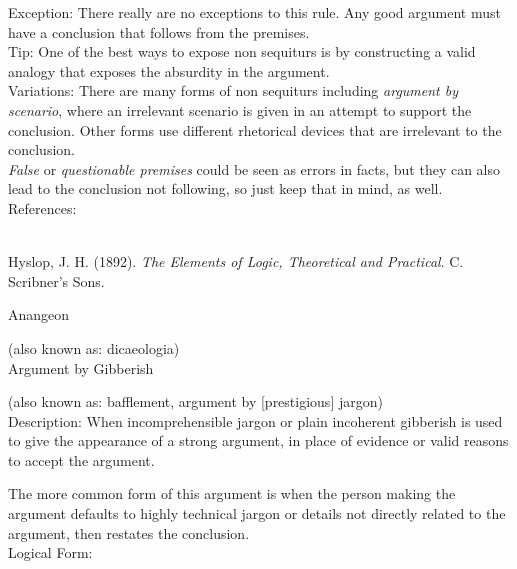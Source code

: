 \documentclass[a4paper,12pt,single,pdftex]{scrartcl}
\begin{document}
{    
      Exception: There really are no exceptions to this rule. Any good argument must have a conclusion that follows from the premises.
    \\

    
      Tip: One of the best ways to expose non sequiturs is by constructing a valid analogy that exposes the absurdity in the argument.
    \\

    
      Variations: There are many forms of non sequiturs including {\it argument by scenario}, where an irrelevant scenario is given in an attempt to support the conclusion.  Other forms use different rhetorical devices that are irrelevant to the conclusion.
    \\

    
      {\it False} or {\it questionable premises} could be seen as errors in facts, but they can also lead to the conclusion not following, so just keep that in mind, as well.
    \\

    References:

    
      
        
      \\

      
        
          Hyslop, J. H. (1892). {\it The Elements of Logic, Theoretical and Practical}. C. Scribner’s Sons.
        
      
    
  }


Anangeon
    
      (also known as: dicaeologia)
    \\

  

Argument by Gibberish
    
      (also known as: bafflement, argument by [prestigious] jargon)
    \\

  
    Description: When incomprehensible jargon or plain incoherent gibberish is used to give the appearance of a strong argument, in place of evidence or valid reasons to accept the argument.

    
      The more common form of this argument is when the person making the argument defaults to highly technical jargon or details not directly related to the argument, then restates the conclusion.
    \\

    
      Logical Form:
    \\
\end{document}
